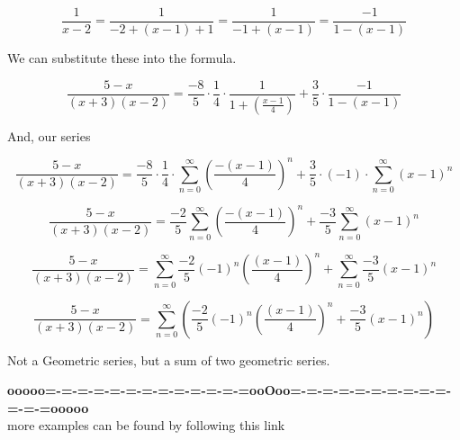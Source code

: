 \documentclass{ximera}
\begin{document}
\[    \frac{1}{x-2} =  \frac{1}{-2 + (x-1)+1}    =  \frac{1}{-1 + (x-1)}   =  \frac{-1}{1 - (x-1)}  \]



We can substitute these into the formula.






\[ \frac{5-x}{(x+3)(x-2)}     =  \frac{-8}{5} \cdot \frac{1}{4} \cdot \frac{1}{1+\left( \frac{x-1}{4} \right) } + \frac{3}{5} \cdot \frac{-1}{1 - (x-1)}      \]



And, our series



\[ \frac{5-x}{(x+3)(x-2)}     =  \frac{-8}{5} \cdot \frac{1}{4} \cdot     \sum_{n=0}^{\infty} \left( \frac{-(x-1)}{4} \right)^n                 + \frac{3}{5} \cdot (-1) \cdot \sum_{n=0}^{\infty} (x-1)^n     \]






\[ \frac{5-x}{(x+3)(x-2)}     =  \frac{-2}{5}     \sum_{n=0}^{\infty} \left( \frac{-(x-1)}{4} \right)^n                 + \frac{-3}{5} \sum_{n=0}^{\infty} (x-1)^n     \]












\[ \frac{5-x}{(x+3)(x-2)}     =      \sum_{n=0}^{\infty} \frac{-2}{5}  (-1)^n \left( \frac{(x-1)}{4} \right)^n                 +  \sum_{n=0}^{\infty} \frac{-3}{5} (x-1)^n     \]







\[ \frac{5-x}{(x+3)(x-2)}     =      \sum_{n=0}^{\infty} \left( \frac{-2}{5}  (-1)^n \left( \frac{(x-1)}{4} \right)^n                 +  \frac{-3}{5} (x-1)^n  \right)   \]










Not a Geometric series, but a sum of two geometric series.





\begin{center}
\end{center}










\begin{center}
\textbf{\textcolor{green!50!black}{ooooo=-=-=-=-=-=-=-=-=-=-=-=-=ooOoo=-=-=-=-=-=-=-=-=-=-=-=-=ooooo}} \\

more examples can be found by following this link\\ 

\end{center}
\end{document}
